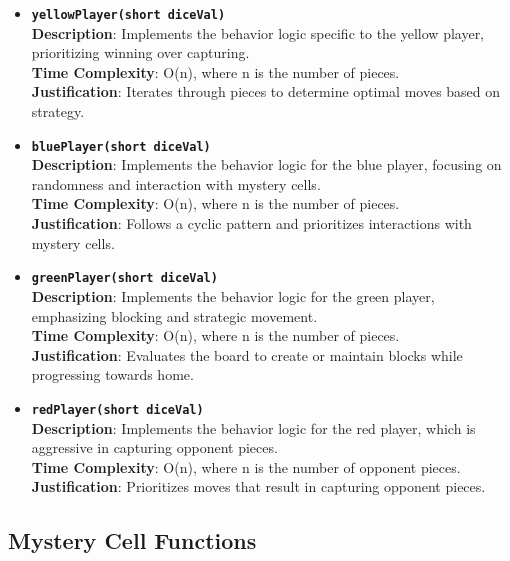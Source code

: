 \documentclass{article}
\begin{document}
        \begin{itemize}
            \item \textbf{\texttt{yellowPlayer(short diceVal)}}\\
            \textbf{Description}: Implements the behavior logic specific to the yellow player, prioritizing winning over capturing.\\
            \textbf{Time Complexity}: O(n), where n is the number of pieces.\\
            \textbf{Justification}: Iterates through pieces to determine optimal moves based on strategy.
            
            \item \textbf{\texttt{bluePlayer(short diceVal)}}\\
            \textbf{Description}: Implements the behavior logic for the blue player, focusing on randomness and interaction with mystery cells.\\
            \textbf{Time Complexity}: O(n), where n is the number of pieces.\\
            \textbf{Justification}: Follows a cyclic pattern and prioritizes interactions with mystery cells.
            
            \item \textbf{\texttt{greenPlayer(short diceVal)}}\\
            \textbf{Description}: Implements the behavior logic for the green player, emphasizing blocking and strategic movement.\\
            \textbf{Time Complexity}: O(n), where n is the number of pieces.\\
            \textbf{Justification}: Evaluates the board to create or maintain blocks while progressing towards home.
            
            \item \textbf{\texttt{redPlayer(short diceVal)}}\\
            \textbf{Description}: Implements the behavior logic for the red player, which is aggressive in capturing opponent pieces.\\
            \textbf{Time Complexity}: O(n), where n is the number of opponent pieces.\\
            \textbf{Justification}: Prioritizes moves that result in capturing opponent pieces.
        \end{itemize}
        
        \subsection{Mystery Cell Functions}
        
\end{document}
